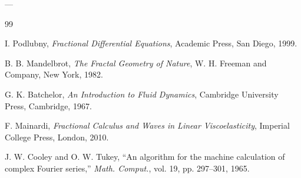 \documentclass[11pt,a4paper]{article}
\begin{document}
---

\begin{thebibliography}{99}

I. Podlubny, \textit{Fractional Differential Equations}, Academic Press, San Diego, 1999.

B. B. Mandelbrot, \textit{The Fractal Geometry of Nature}, W. H. Freeman and Company, New York, 1982.

G. K. Batchelor, \textit{An Introduction to Fluid Dynamics}, Cambridge University Press, Cambridge, 1967.

F. Mainardi, \textit{Fractional Calculus and Waves in Linear Viscoelasticity}, Imperial College Press, London, 2010.

J. W. Cooley and O. W. Tukey, ``An algorithm for the machine calculation of complex Fourier series,'' \textit{Math. Comput.}, vol. 19, pp. 297--301, 1965.

\end{thebibliography}
\end{document}
